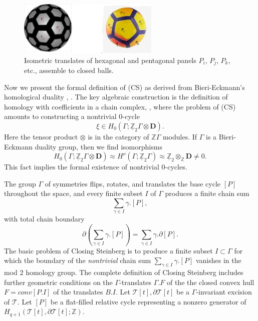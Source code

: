 \documentclass[12pt]{amsart}
\theoremstyle{definition}
\theoremstyle{remark}
\newcommand{\bZ}{\mathbb{Z}}
\newcommand{\del}{\partial}
\newcommand{\bD}{\textbf{D}}
\newcommand{\sT}{\mathscr{T}}
\begin{document}


\begin{figure}
\centering
\includegraphics[width=0.6\textwidth]{ball-nike-pitch.jpg}
\caption{Isometric translates of hexagonal and pentagonal panels $P_i$, $P_j$, $P_k$, etc., assemble to closed balls.}
\label{nikeball}
\end{figure}

Now we present the formal definition of (CS) as derived from Bieri-Eckmann's homological duality \cite{BiEck}, \cite{BS}. The key algebraic construction is the definition of homology with coefficients in a chain complex, \cite{Brown}, where the problem of (CS) amounts to constructing a nontrivial $0$-cycle $$\xi \in H_0(\Gamma; \underline{\bZ}_2 \Gamma \otimes \bD).$$ Here the tensor product $\otimes$ is in the category of $\bZ \Gamma$ modules. If $\Gamma$ is a Bieri-Eckmann duality group, then we find isomorphisms $$H_0(\Gamma; \underline{\bZ}_2 \Gamma \otimes \bD) \approx H^\nu(\Gamma; \underline{\bZ}_2 \Gamma)\approx \underline{\bZ}_2 \otimes_\bZ \textbf{D}\neq 0.$$ This fact implies the formal existence of nontrivial $0$-cycles. 



The group $\Gamma$ of symmetries flips, rotates, and translates the base cycle $[P]$ throughout the space, and every finite subset $I$ of $\Gamma$ produces a finite chain sum $$\sum_{\gamma\in I} \gamma.[P],$$ with total chain boundary $$\del(\sum_{\gamma\in I} \gamma.[P])=\sum_{\gamma\in I} \gamma.\del [P].$$ The basic problem of Closing Steinberg is to produce a finite subset $I \subset \Gamma$ for which the boundary of the \emph{nontrivial} chain sum $\sum_{\gamma\in I} \gamma.[P]$ vanishes in the mod $2$ homology group. The complete definition of Closing Steinberg includes further geometric conditions on the $\Gamma$-translates $\Gamma.F$ of the the closed convex hull $F=conv[P.I]$ of the translates $B.I$. Let $\sT[t], \del \sT[t]$ be a $\Gamma$-invariant excision of $\sT$. Let $[P]$ be a flat-filled relative cycle representing a nonzero generator of $H_{q+1}(\sT[t], \del \sT[t]; \bZ)$.
\end{document}

